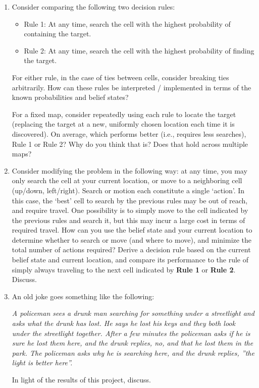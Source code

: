 \documentclass[letter]{article}
\begin{document}
\begin{enumerate}
	\item {Consider comparing the following two decision rules:
		\begin{itemize}
			\item {Rule 1: At any time, search the cell with the highest probability of containing the target.}
			\item {Rule 2: At any time, search the cell with the highest probability of finding the target.}
		\end{itemize} 
		\par{For either rule, in the case of ties between cells, consider breaking ties arbitrarily. How can these rules be interpreted / implemented in terms of the known probabilities and belief states?}
		\par{For a fixed map, consider repeatedly using each rule to locate the target (replacing the target at a new,
			uniformly chosen location each time it is discovered). On average, which performs better (i.e., requires less
			searches), Rule 1 or Rule 2? Why do you think that is? Does that hold across multiple maps?}
		}
	
	\item {Consider modifying the problem in the following way: at any time, you may only search the cell at your
		current location, or move to a neighboring cell (up/down, left/right). Search or motion each constitute a single
		`action'. In this case, the `best' cell to search by the previous rules may be out of reach, and require travel.
		One possibility is to simply move to the cell indicated by the previous rules and search it, but this may incur a
		large cost in terms of required travel. How can you use the belief state and your current location to determine
		whether to search or move (and where to move), and minimize the total number of actions required? Derive a
		decision rule based on the current belief state and current location, and compare its performance to the rule
		of simply always traveling to the next cell indicated by \textbf{Rule 1} or \textbf{Rule 2}. Discuss.}
	
	\item {An old joke goes something like the following: 
		\begin{center}
			\textit{A policeman sees a drunk man searching for something under a streetlight and asks what the drunk has lost.
				He says he lost his keys and they both look under the streetlight together. After a few minutes the policeman
				asks if he is sure he lost them here, and the drunk replies, no, and that he lost them in the park. The
				policeman asks why he is searching here, and the drunk replies, ”the light is better here”.}
		\end{center}
		\par{In light of the results of this project, discuss.}
		}
\end{enumerate}
\end{document}
